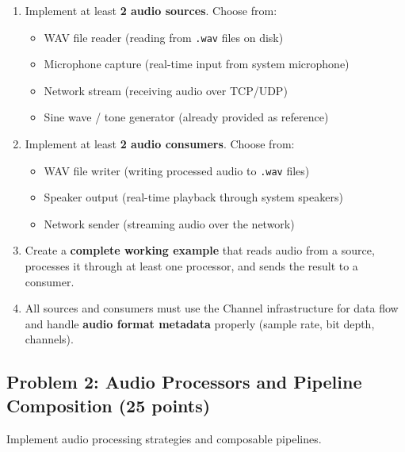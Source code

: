 \documentclass[a4paper,12pt]{article}
\begin{document}
\begin{enumerate}
    \item Implement at least \textbf{2 audio sources}. Choose from:
    \begin{itemize}
        \item WAV file reader (reading from \texttt{.wav} files on disk)
        \item Microphone capture (real-time input from system microphone)
        \item Network stream (receiving audio over TCP/UDP)
        \item Sine wave / tone generator (already provided as reference)
    \end{itemize}

    \item Implement at least \textbf{2 audio consumers}. Choose from:
    \begin{itemize}
        \item WAV file writer (writing processed audio to \texttt{.wav} files)
        \item Speaker output (real-time playback through system speakers)
        \item Network sender (streaming audio over the network)
    \end{itemize}

    \item Create a \textbf{complete working example} that reads audio from a source,
          processes it through at least one processor, and sends the result to a consumer.

    \item All sources and consumers must use the Channel infrastructure for data flow
          and handle \textbf{audio format metadata} properly (sample rate, bit depth, channels).
\end{enumerate}

\subsection{Problem 2: Audio Processors and Pipeline Composition \hfill \textbf{(25 points)}}

Implement audio processing strategies and composable pipelines.
\end{document}
